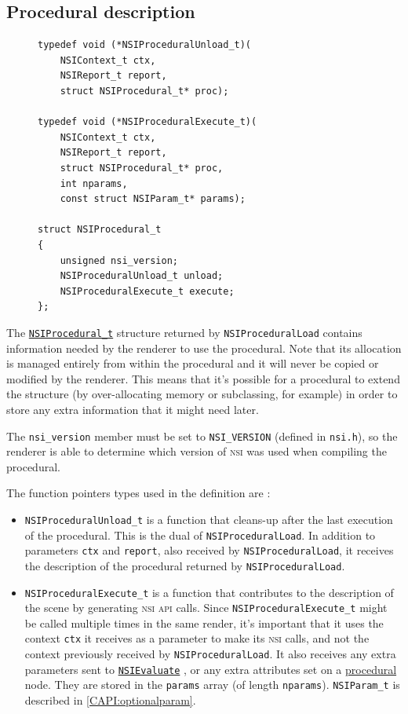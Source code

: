 \documentclass[oneside,ebook]{memoir}
\newcommand*{\acronym}[1]{\textsc{\lowercase{#1}}}
\begin{document}
\subsection{Procedural description}
\begin{figure}
\footnotesize
\begin{lstlisting}[frame=top,frame=bottom,caption={Definition of \lstinline|NSIProcedural_t|},style=CAPI,label={fig:nsiprocedural_t}]
typedef void (*NSIProceduralUnload_t)(
	NSIContext_t ctx,
	NSIReport_t report,
	struct NSIProcedural_t* proc);

typedef void (*NSIProceduralExecute_t)(
	NSIContext_t ctx,
	NSIReport_t report,
	struct NSIProcedural_t* proc,
	int nparams,
	const struct NSIParam_t* params);

struct NSIProcedural_t
{
	unsigned nsi_version;
	NSIProceduralUnload_t unload;
	NSIProceduralExecute_t execute;
};
\end{lstlisting}
\end{figure}
The \hyperref[fig:nsiprocedural_t]{\lstinline|NSIProcedural_t|} structure returned by \lstinline|NSIProceduralLoad| contains information needed by the renderer to use the procedural. Note that its allocation is managed entirely from within the procedural and it will never be copied or modified by the renderer. This means that it's possible for a procedural to extend the structure (by over-allocating memory or subclassing, for example) in order to store any extra information that it might need later.

The \lstinline|nsi_version| member must be set to \lstinline|NSI_VERSION| (defined in \lstinline|nsi.h|), so the renderer is able to determine which version of \acronym{NSI} was used when compiling the procedural.

The function pointers types used in the definition are :
\begin{itemize}
\item \lstinline|NSIProceduralUnload_t| is a function that cleans-up after the last execution of the procedural.
This is the dual of \lstinline|NSIProceduralLoad|.
In addition to parameters \lstinline|ctx| and \lstinline|report|, also received by \lstinline|NSIProceduralLoad|, it receives the description of the procedural returned by \lstinline|NSIProceduralLoad|.
\item \lstinline|NSIProceduralExecute_t| is a function that contributes to the description of the scene by generating \acronym{NSI} \acronym{API} calls.
Since \lstinline|NSIProceduralExecute_t| might be called multiple times in the same render, it's important that it uses the context \lstinline|ctx| it receives as a parameter to make its \acronym{NSI} calls, and not the context previously received by \lstinline|NSIProceduralLoad|.
It also receives any extra parameters sent to \hyperref[CAPI:nsievaluate]{\lstinline|NSIEvaluate|} , or any extra attributes set on a \hyperref[section:proceduralnode]{procedural} node.
They are stored in the \lstinline|params| array (of length \lstinline|nparams|).
\lstinline|NSIParam_t| is described in \autoref{CAPI:optionalparam}.
\end{itemize}
\end{document}
